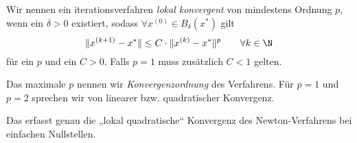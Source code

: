 \documentclass[11pt]{scrartcl}
\begin{document}
\begin{df}[Konvergenzordnung] \label{3.11}
	Wir nennen ein iterationsverfahren \emph{lokal konvergent} von mindestens Ordnung $p$, wenn ein $\delta > 0$ existiert, sodass $\forall x^{(0)} \in B_\delta(x^*)$ gilt
	\[
		\|x^{(k+1)} - x^*\| \le C \cdot \|x^{(k)} - x^*\|^p
		\qquad \forall k\in \N
	\]
	für ein $p$ und ein $C > 0$.
	Falls $p=1$ muss zusätzlich $C < 1$ gelten.

	Das maximale $p$ nennen wir \emph{Konvergenzordnung} des Verfahrens.
	Für $p=1$ und $p=2$ sprechen wir von linearer bzw. quadratischer Konvergenz.
	\begin{note}
		Das erfasst genau die „lokal quadratische“ Konvergenz des Newton-Verfahrens bei einfachen Nullstellen.
	\end{note}
\end{df}
\end{document}
